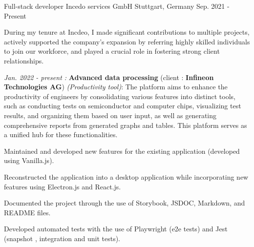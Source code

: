 

\begin{cventries}

  \cventry
    {Full-stack developer} %
    {Incedo services GmbH} %
    {Stuttgart, Germany} %
    {Sep. 2021 - Present} %
    {
      During my tenure at Incdeo, I made significant contributions to multiple projects, actively supported the company's
      expansion by referring highly skilled individuals to join our workforce, and played a crucial role in fostering strong
      client relationships.
      \vspace{5mm}
      \begin{cvitems} %
        \item {
          \textit{Jan. 2022 - present : }\textbf{Advanced data processing} (client : \textbf{Infineon Technologies AG}) \textit{(Productivity tool)}:
          \newline The platform aims to enhance the productivity of engineers by consolidating various features into distinct tools, such as conducting tests on semiconductor and computer chips, visualizing test results, and organizing them based on user input, as well as generating comprehensive reports from generated graphs and tables. This platform serves as a unified hub for these functionalities.
          \vspace{5mm}
        \begin{cvitems}
          \item {Maintained and developed new features for the existing application (developed using Vanilla.js).}
          \item {Reconstructed the application into a desktop application while incorporating new features using Electron.js and React.js.}
          \item {Documented the project through the use of Storybook, JSDOC, Markdown, and README files.}
          \item {Developed automated tests with the use of Playwright (e2e tests) and Jest (snapshot , integration and unit tests).}

\end{cvitems}}
\end{cvitems}}
\end{cventries}
